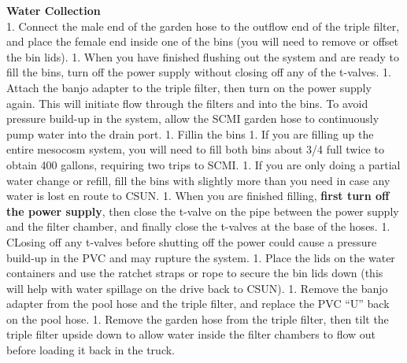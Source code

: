 \documentclass[]{book}
\begin{document}
 \textbf{Water Collection}\\
1. Connect the male end of the garden hose to the outflow end of the
triple filter, and place the female end inside one of the bins (you will
need to remove or offset the bin lids). 1. When you have finished
flushing out the system and are ready to fill the bins, turn off the
power supply without closing off any of the t-valves. 1. Attach the
banjo adapter to the triple filter, then turn on the power supply again.
This will initiate flow through the filters and into the bins. To avoid
pressure build-up in the system, allow the SCMI garden hose to
continuously pump water into the drain port. 1. Fillin the bins 1. If
you are filling up the entire mesocosm system, you will need to fill
both bins about 3/4 full twice to obtain 400 gallons, requiring two
trips to SCMI. 1. If you are only doing a partial water change or
refill, fill the bins with slightly more than you need in case any water
is lost en route to CSUN. 1. When you are finished filling,
\textbf{first turn off the power supply}, then close the t-valve on the
pipe between the power supply and the filter chamber, and finally close
the t-valves at the base of the hoses. 1. CLosing off any t-valves
before shutting off the power could cause a pressure build-up in the PVC
and may rupture the system. 1. Place the lids on the water containers
and use the ratchet straps or rope to secure the bin lids down (this
will help with water spillage on the drive back to CSUN). 1. Remove the
banjo adapter from the pool hose and the triple filter, and replace the
PVC ``U'' back on the pool hose. 1. Remove the garden hose from the
triple filter, then tilt the triple filter upside down to allow water
inside the filter chambers to flow out before loading it back in the
truck.
\end{document}
